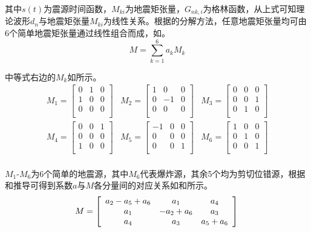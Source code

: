 其中$s(t)$为震源时间函数，$M_{ki}$为地震矩张量，$G_{nk,i}$为格林函数，从上式可知理论波形$d_n$与地震矩张量$M_{ki}$为线性关系。根据\citet{Kikuchi1991}的分解方法，任意地震矩张量均可由6个简单地震矩张量通过线性组合而成，如。
\begin{equation}
\label{eq2_02}
M=\sum_{k=1}^6a_kM_k
\end{equation}

中等式右边的$M_k$如所示。
\begin{equation}
\label{eq2_03}
\begin{array}{ccc}
M_1=\left[\begin{array}{ccc}
0 & 1 & 0\\
1 & 0 & 0\\
0 & 0 & 0\\
\end{array}\right]&
M_2=\left[\begin{array}{ccc}
1 & 0 & 0\\
0 & -1 & 0\\
0 & 0 & 0\\
\end{array}\right]&
M_3=\left[\begin{array}{ccc}
0 & 0 & 0\\
0 & 0 & 1\\
0 & 1 & 0\\
\end{array}\right]\\
M_4=\left[\begin{array}{ccc}
0 & 0 & 1\\
0 & 0 & 0\\
1 & 0 & 0\\
\end{array}\right]&
M_5=\left[\begin{array}{ccc}
-1 & 0 & 0\\
0 & 0 & 0\\
0 & 0 & 1\\
\end{array}\right]&
M_6=\left[\begin{array}{ccc}
1 & 0 & 0\\
0 & 1 & 0\\
0 & 0 & 1\\
\end{array}\right]\\
\end{array}
\end{equation}

$M_1$-$M_6$为6个简单的地震源，其中$M_6$代表爆炸源，其余5个均为剪切位错源，根据和推导可得到系数$a$与$M$各分量间的对应关系如和所示。
\begin{equation}
\label{eq2_04}
M=\left[\begin{array}{ccc}
a_2-a_5+a_6 & a_1 & a_4\\
a_1 & -a_2+a_6 & a_3\\
a_4 & a_3 & a_5+a_6\\
\end{array}\right]\\
\end{equation}


